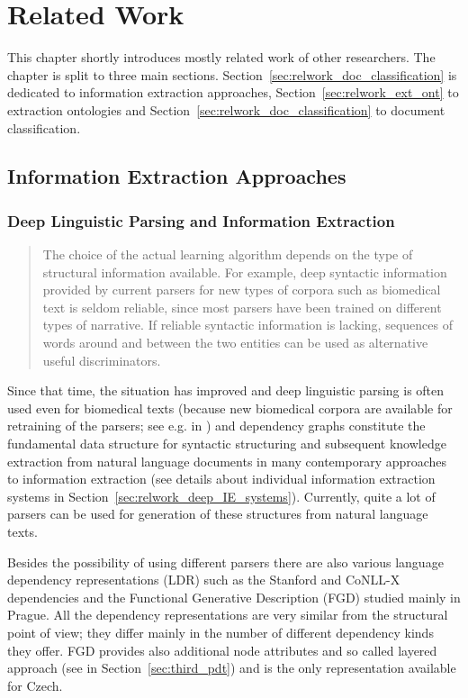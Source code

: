 \chapter{Related Work} \label{sec:ch_related}

This chapter shortly introduces mostly related work of other researchers. The chapter is split to three main sections. Section~\ref{sec:relwork_doc_classification} is dedicated to information extraction approaches, Section~\ref{sec:relwork_ext_ont} to extraction ontologies and Section~\ref{sec:relwork_doc_classification} to document classification.

\section{Information Extraction Approaches} \label{sec:relwork_ie}

\subsection{Deep Linguistic Parsing and Information Extraction}

\begin{quotation}
The choice of the actual learning algorithm depends on the type of structural information available. For example, deep syntactic information provided by current parsers for new types of corpora such as biomedical text is seldom reliable, since most parsers have been trained on different types of narrative. If reliable syntactic information is lacking, sequences of words around and between the two entities can be used as alternative useful discriminators. \citep{Bunescu:phd}
\end{quotation}
Since that time, the situation has improved and deep linguistic parsing is often used even for biomedical texts (because new biomedical corpora are available for retraining of the parsers; see e.g. in \citep{Buyko:2010:EIA:1870658.1870754}) and  dependency graphs constitute the fundamental data structure for syntactic structuring and subsequent knowledge extraction from natural language documents in many contemporary approaches to information extraction (see details about individual information extraction systems in Section~\ref{sec:relwork_deep_IE_systems}). Currently, quite a lot of parsers can be used for generation of these structures from natural language texts. 

Besides the possibility of using different parsers there are also various language dependency representations (LDR) such as the Stanford \citep{stanfordDeps} and CoNLL-X \citep{johansson2007a} dependencies and the Functional Generative Description (FGD) \citep{SgallHajicovaPanevova1986} studied mainly in Prague. All the dependency representations are very similar from the structural point of view; they differ mainly in the number of different dependency kinds they offer. FGD provides also additional node attributes and so called layered approach (see in Section~\ref{sec:third_pdt}) and is the only representation available for Czech.


